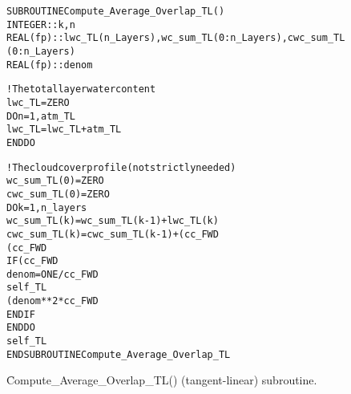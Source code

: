 \begin{figure}[H]
  \caption{\f{Compute\_Average\_Overlap\_TL()} (tangent-linear) subroutine.}
  \label{fig:Compute_Average_Overlap_TL_subroutine}
  \lineacrosspage
  \centering
  \begin{alltt}
SUBROUTINE Compute_Average_Overlap_TL()
  INTEGER  :: k, n
  REAL(fp) :: lwc_TL(n_Layers), wc_sum_TL(0:n_Layers), cwc_sum_TL(0:n_Layers)
  REAL(fp) :: denom

  ! The total layer water content
  lwc_TL = ZERO
  DO n = 1, atm_TL%n_Clouds
    lwc_TL = lwc_TL + atm_TL%Cloud(n)%Water_Content(1:n_layers)
  END DO

  ! The cloud cover profile (not strictly needed)
  wc_sum_TL(0)  = ZERO
  cwc_sum_TL(0) = ZERO
  DO k = 1, n_layers
     wc_sum_TL(k) =  wc_sum_TL(k-1) +  lwc_TL(k)
    cwc_sum_TL(k) = cwc_sum_TL(k-1) + (cc_FWD%Cloud_Fraction(k) * lwc_TL(k)                ) + &
                                      (cc_FWD%iVar%lwc(k)       * self_TL%Cloud_Fraction(k))
    IF ( cc_FWD%iVar%wc_sum(k) > ZERO ) THEN
      denom = ONE/cc_FWD%iVar%wc_sum(k)
      self_TL%Cloud_Cover(k) = (denom                             * cwc_sum_TL(k)) - &
                               (denom**2 * cc_FWD%iVar%cwc_sum(k) * wc_sum_TL(k) )
    END IF
  END DO
  self_TL%Total_Cloud_Cover = self_TL%Cloud_Cover(n_layers)
END SUBROUTINE Compute_Average_Overlap_TL\end{alltt}
  \lineacrosspage
\end{figure}


